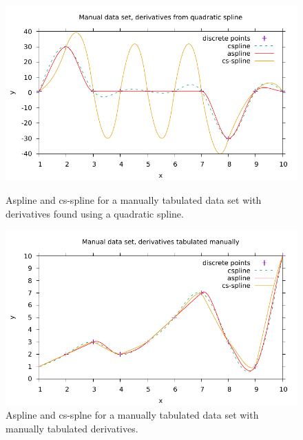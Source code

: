 \documentclass{article}
\begin{document}
\begin{figure}[h]
\includegraphics[width=\linewidth]{manualaspline2.pdf}
\caption{Aspline and cs-spline for a manually tabulated data set with derivatives found using a quadratic spline.}
\label{fig:man}

\includegraphics[width=\linewidth]{manualaspline.pdf}
\caption{Aspline and cs-splne for a manually tabulated data set with manually tabulated derivatives.}
\label{fig:man2a}
\end{figure} 
\clearpage
\end{document}
